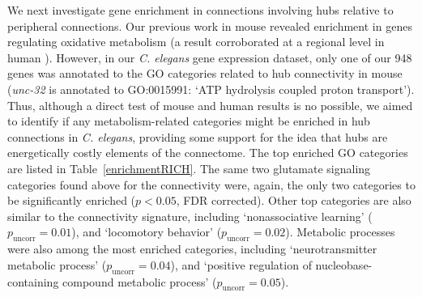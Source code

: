 \documentclass[10pt,letterpaper]{article}
\begin{document}
We next investigate gene enrichment in connections involving hubs relative to peripheral connections.
Our previous work in mouse revealed enrichment in genes regulating oxidative metabolism \cite{Fulcher:2016ck} (a result corroborated at a regional level in human \cite{Vertes2016a}).
However, in our \emph{C. elegans} gene expression dataset, only one of our 948 genes was annotated to the GO categories related to hub connectivity in mouse (\emph{unc-32} is annotated to GO:0015991: `ATP hydrolysis coupled proton transport').
Thus, although a direct test of mouse and human results is no possible, we aimed to identify if any metabolism-related categories might be enriched in hub connections in \emph{C. elegans}, providing some support for the idea that hubs are energetically costly elements of the connectome.
The top enriched GO categories are listed in Table~\ref{enrichmentRICH}.
The same two glutamate signaling categories found above for the connectivity were, again, the only two categories to be significantly enriched ($p<0.05$, FDR corrected).
Other top categories are also similar to the connectivity signature, including `nonassociative learning' ($p_\mathrm{uncorr} = 0.01$), and `locomotory behavior' ($p_\mathrm{uncorr} = 0.02$).
Metabolic processes were also among the most enriched categories, including `neurotransmitter metabolic process' ($p_\mathrm{uncorr} = 0.04$), and `positive regulation of nucleobase-containing compound metabolic process' ($p_\mathrm{uncorr} = 0.05$).
\end{document}
